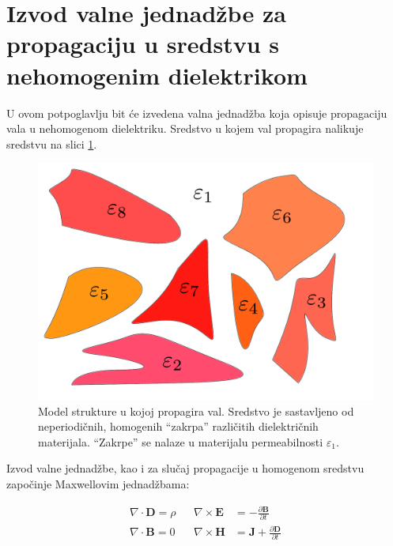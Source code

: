 \documentclass[utf8, seminar]{fer}
\begin{document}



\section{Izvod valne jednadžbe za propagaciju u sredstvu s nehomogenim dielektrikom}

U ovom potpoglavlju bit će izvedena valna jednadžba koja opisuje propagaciju
vala u nehomogenom dielektriku. Sredstvo u kojem val propagira nalikuje sredstvu
na slici \ref{fig:structure}.

\begin{figure}[h]
	\centering
	\includegraphics[width = 1.0\linewidth]{./images/structure-model.pdf}
	\caption{Model strukture u kojoj propagira val. Sredstvo je sastavljeno od
	neperiodičnih, homogenih ``zakrpa'' različitih dielektričnih materijala.
	``Zakrpe'' se nalaze u materijalu permeabilnosti $\varepsilon_1$.}
	\label{fig:structure}
\end{figure}

Izvod valne jednadžbe, kao i za slučaj propagacije u homogenom sredstvu započinje
Maxwellovim jednadžbama:

\begin{align} \label{eq:maxwell1}
	\nabla \cdot \mathbf{D} = \rho &&
	\nabla \times \mathbf{E} &=
		- \frac{\partial \mathbf{B}}{\partial t}  \nonumber \\
	\nabla \cdot \mathbf{B} = 0 &&
	\nabla \times \mathbf{H} &=
		\mathbf{J} + \frac{\partial \mathbf{D}}{\partial t}
\end{align}
\end{document}
